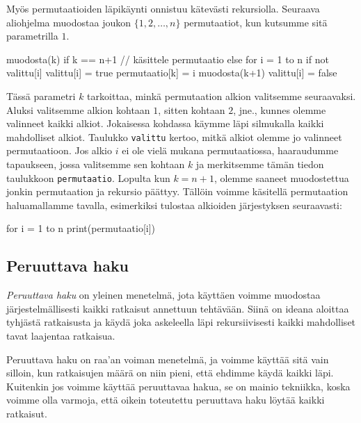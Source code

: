 Myös permutaatioiden läpikäynti onnistuu kätevästi rekursiolla.
Seuraava aliohjelma muodostaa joukon $\{1,2,\dots,n\}$ permutaatiot,
kun kutsumme sitä parametrilla $1$.

\begin{code}
muodosta(k)
    if k == n+1
        // käsittele permutaatio
    else
        for i = 1 to n
            if not valittu[i]
                valittu[i] = true
                permutaatio[k] = i
                muodosta(k+1)
                valittu[i] = false
\end{code}

Tässä parametri $k$ tarkoittaa, minkä permutaation alkion valitsemme
seuraavaksi.
Aluksi valitsemme alkion kohtaan $1$, sitten kohtaan $2$,
jne., kunnes olemme valinneet kaikki alkiot.
Jokaisessa kohdassa käymme läpi silmukalla kaikki mahdolliset alkiot.
Taulukko \texttt{valittu} kertoo, mitkä alkiot olemme jo valinneet
permutaatioon.
Jos alkio $i$ ei ole vielä mukana permutaatiossa, haaraudumme tapaukseen,
jossa valitsemme sen kohtaan $k$ ja merkitsemme tämän tiedon
taulukkoon \texttt{permutaatio}.
Lopulta kun $k=n+1$, olemme saaneet muodostettua jonkin permutaation
ja rekursio päättyy.
Tällöin voimme käsitellä permutaation haluamallamme tavalla,
esimerkiksi tulostaa alkioiden järjestyksen seuraavasti:

\begin{code}
for i = 1 to n
    print(permutaatio[i])
\end{code}

\subsection{Peruuttava haku}

\emph{Peruuttava haku} on yleinen menetelmä,
jota käyttäen voimme muodostaa järjestelmällisesti
kaikki ratkaisut annettuun tehtävään.
Siinä on ideana aloittaa tyhjästä ratkaisusta ja käydä
joka askeleella läpi rekursiivisesti kaikki mahdolliset tavat laajentaa ratkaisua.

Peruuttava haku on raa'an voiman menetelmä,
ja voimme käyttää sitä vain silloin,
kun ratkaisujen määrä on niin pieni,
että ehdimme käydä kaikki läpi.
Kuitenkin jos voimme käyttää peruuttavaa hakua,
se on mainio tekniikka,
koska voimme olla varmoja, että oikein toteutettu
peruuttava haku löytää kaikki ratkaisut.

